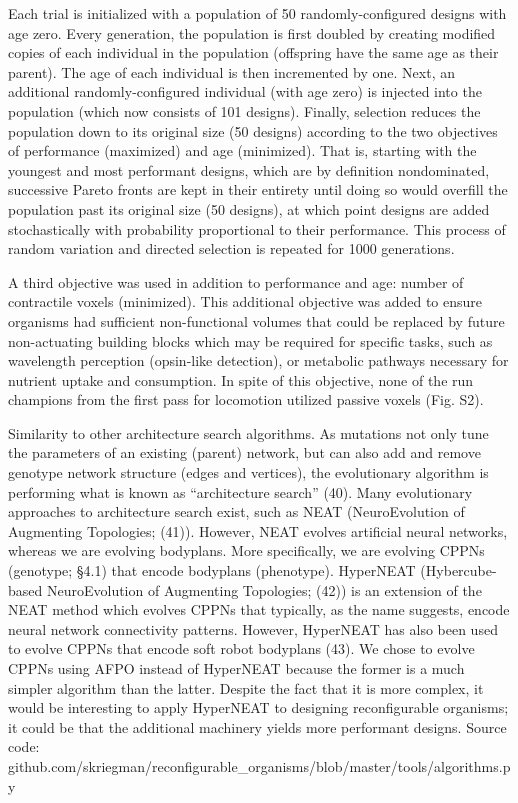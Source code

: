 Each trial is initialized with a population of 50 randomly-configured designs with age zero. Every generation, the population is first doubled by creating modified copies of each individual in the population (offspring have the same age as their parent). The age of each individual is then incremented by one. Next, an additional randomly-configured individual (with age zero) is injected into the population (which now consists of 101 designs). Finally, selection reduces the population down to its original size (50 designs) according to the two objectives of performance (maximized) and age (minimized). That is, starting with the youngest and most performant designs, which are by definition nondominated, successive Pareto fronts are kept in their entirety until doing so would overfill the population past its original size (50 designs), at which point designs are added stochastically with probability proportional to their performance. This process of random variation and directed selection is repeated for 1000 generations.

A third objective was used in addition to performance and age: number of contractile voxels (minimized). This additional objective was added to ensure organisms had sufficient non-functional volumes that could be replaced by future non-actuating building blocks which may be required for specific tasks, such as wavelength perception (opsin-like detection), or metabolic pathways necessary for nutrient uptake and consumption. In spite of this objective, none of the run champions from the first pass for locomotion utilized passive voxels (Fig. S2).

Similarity to other architecture search algorithms.  As mutations not only tune the parameters of an existing (parent) network, but can also add and remove genotype network structure (edges and vertices), the evolutionary algorithm is performing what is known as ``architecture search'' (40). Many evolutionary approaches to architecture search exist, such as NEAT (NeuroEvolution of Augmenting Topologies; (41)). However, NEAT evolves artificial neural networks, whereas we are evolving bodyplans. More specifically, we are evolving CPPNs (genotype; §4.1) that encode bodyplans (phenotype). HyperNEAT (Hybercube-based NeuroEvolution of Augmenting Topologies; (42)) is an extension of the NEAT method which evolves CPPNs that typically, as the name suggests, encode neural network connectivity patterns. However, HyperNEAT has also been used to evolve CPPNs that encode soft robot bodyplans (43). We chose to evolve CPPNs using AFPO instead of HyperNEAT because the former is a much simpler algorithm than the latter. Despite the fact that it is more complex, it would be interesting to apply HyperNEAT to designing reconfigurable organisms; it could be that the additional machinery yields more performant designs. 
Source code: github.com/skriegman/reconfigurable\_organisms/blob/master/tools/algorithms.py


